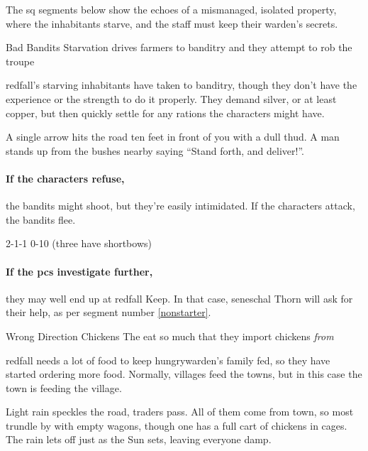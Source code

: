 The \gls{sq} \glspl{segment} below show the echoes of a mismanaged, isolated property, where the inhabitants starve, and the staff must keep their \gls{warden}'s secrets.

{Bad Bandits}%
{Starvation drives  farmers to banditry and they attempt to rob the troupe}%

\Gls{redfall}'s starving inhabitants have taken to banditry, though they don't have the experience or the strength to do it properly.
They demand silver, or at least copper, but then quickly settle for any \glspl{ration} the characters might have.

\begin{boxtext}
  A single arrow hits the road ten feet in front of you with a dull thud.
  A man stands up from the bushes nearby saying ``Stand forth, and deliver!''.
\end{boxtext}

\paragraph{If the characters refuse,}
the bandits might shoot, but they're easily intimidated.
If the characters attack, the bandits flee.

%
  {{2}{-1}{-1}}%
  {{0}{-1}{0}}%
  {%
    \Dagger
  }%
  {}%
  {(three have shortbows)}%
  {}%

\paragraph{If the \glspl{pc} investigate further,}
they may well end up at \gls{redfall} Keep.
In that case, \gls{seneschal} Thorn will ask for their help, as per \gls{segment} number \vref{nonstarter}.

{Wrong Direction Chickens}%
{The   eat so much that they import chickens \emph{from} }%

\Gls{redfall} needs a lot of food to keep \gls{hungrywarden}'s family fed, so they have started ordering more food.
Normally, \glspl{village} feed the towns, but in this case the town is feeding the \gls{village}.

\begin{boxtext}
  Light rain speckles the road, traders pass.
  All of them come from \gls{town}, so most trundle by with empty wagons, though one has a full cart of chickens in cages.
  The rain lets off just as the Sun sets, leaving everyone damp.
\end{boxtext}


